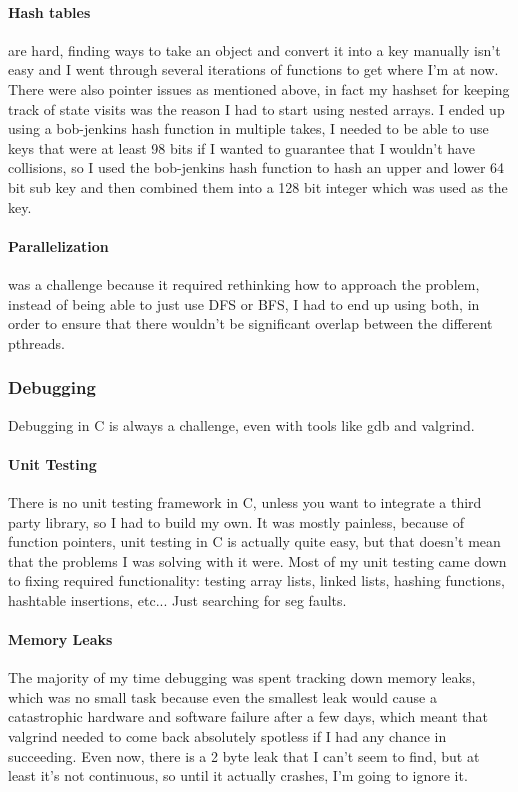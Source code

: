 \documentclass{article}
\begin{document}
\paragraph{Hash tables} are hard, finding ways to take an object and convert it into a key manually isn't easy and I went through several iterations of functions to get where I'm at now. There were also pointer issues as mentioned above, in fact my hashset for keeping track of state visits was the reason I had to start using nested arrays. I ended up using a bob-jenkins hash function in multiple takes, I needed to be able to use keys that were at least 98 bits if I wanted to guarantee that I wouldn't have collisions, so I used the bob-jenkins hash function to hash an upper and lower 64 bit sub key and then combined them into a 128 bit integer  which was used as the key.

\paragraph{Parallelization} was a challenge because it required rethinking how to approach the problem, instead of being able to just use DFS or BFS, I had to end up using both, in order to ensure that there wouldn't be significant overlap between the different pthreads.

\subsubsection{Debugging}

Debugging in C is always a challenge, even with tools like gdb and valgrind. 

\paragraph{Unit Testing} There is no unit testing framework in C, unless you want to integrate a third party library, so I had to build my own. It was mostly painless, because of function pointers, unit testing in C is actually quite easy, but that doesn't mean that the problems I was solving with it were. Most of my unit testing came down to fixing required functionality: testing array lists, linked lists, hashing functions, hashtable insertions, etc... Just searching for seg faults.

\paragraph{Memory Leaks} The majority of my time debugging was spent tracking down memory leaks, which was no small task because even the smallest leak would cause a catastrophic hardware and software failure after a few days, which meant that valgrind needed to come back absolutely spotless if I had any chance in succeeding. Even now, there is a 2 byte leak that I can't seem to find, but at least it's not continuous, so until it actually crashes, I'm going to ignore it.
\end{document}

